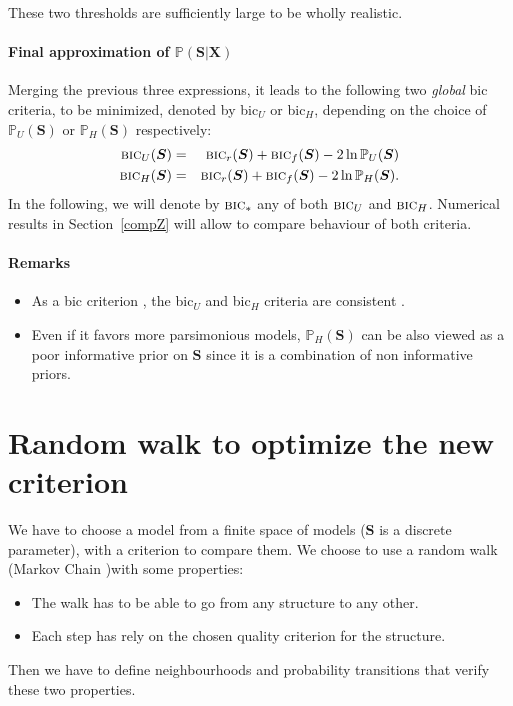 \documentclass[12pt,a4paper]{report}
\begin{document}
These two thresholds are sufficiently large to be wholly realistic.

\paragraph{Final approximation of $\mathbb{P}(\boldsymbol{S}|\boldsymbol{X})$}
Merging the previous three expressions, it leads to the following two {\it global} {\sc bic} criteria, to be minimized, denoted by {\sc bic}$_U$ or {\sc bic}$_H$, depending on the choice of $\mathbb{P}_U(\boldsymbol{S})$ or $\mathbb{P}_H(\boldsymbol{S})$ respectively:
\begin{eqnarray}
\mbox{{\sc bic}}_U(\boldsymbol{S}) & = & \mbox{{\sc bic}}_r(\boldsymbol{S}) + \mbox{{\sc bic}}_f(\boldsymbol{S}) - 2\ln \mathbb{P}_U(\boldsymbol{S})  \nonumber \\
\mbox{{\sc bic}}_H(\boldsymbol{S}) & = & \mbox{{\sc bic}}_r(\boldsymbol{S}) + \mbox{{\sc bic}}_f(\boldsymbol{S}) - 2\ln \mathbb{P}_H(\boldsymbol{S}). \nonumber 
\end{eqnarray}
In the following, we will denote by $\mbox{{\sc bic}}_*$ any of both $\mbox{{\sc bic}}_U$ and $\mbox{{\sc bic}}_H$. Numerical results in Section~\ref{compZ} will allow to compare behaviour of both criteria.

\paragraph{Remarks}
\begin{itemize}
\item As a {\sc bic} criterion \cite{BIChuard}, the {\sc bic}$_U$ and {\sc bic}$_H$ criteria are consistent .
\item Even if it favors more parsimonious models, $\mathbb{P}_H(\boldsymbol{S})$ can be also viewed as a poor informative prior on $\boldsymbol{S}$ since it is a combination of non informative priors.
\end{itemize}



%	 
%	
			
			
	\section{Random walk to optimize the new criterion}
		We have to choose a model from a finite space of models ($\boldsymbol{S}$ is a discrete parameter), with a criterion to compare them. We choose to use a random walk (Markov Chain \cite{robert2005monte})with some properties:
		\begin{itemize}
			\item The walk has to be able to go from any structure to any other.
			\item Each step has rely on the chosen quality criterion for the structure. 
		\end{itemize}
		Then we have to define neighbourhoods and probability transitions that verify these two properties.
\end{document}
